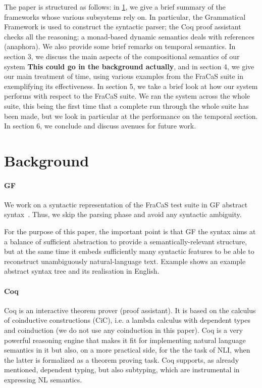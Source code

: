 \documentclass[a4paper,11pt]{article}
\begin{document}
The paper is structured as follows: in \cref{sec:background}, we give
a brief summary of the frameworks whose various subsystems rely on. In
particular, the Grammatical Framework is used to construct the
syntactic parser; the Coq proof assistant checks all the reasoning; a
monad-based dynamic semantics deals with references (anaphora).  We
also provide some brief remarks on temporal semantics. In section 3,
we discuss the main aspects of the compositional semantics of our
system \textbf{This could go in the background actually}, and in
section 4, we give our main treatment of time, using various examples
from the FraCaS suite in exemplifying its effectiveness. In section 5,
we take a brief look at how our system performs with respect to the
FraCaS suite. We ran the system across the whole suite, this being the
first time that a complete run through the whole suite has been made,
but we look in particular at the performance on the temporal
section. In section 6, we conclude and discuss avenues for future
work.



\section{Background}
\label{sec:background}

\paragraph{GF}
We work on a syntactic representation of the FraCaS test suite in GF
abstract syntax~\citep{Ljunglof:2012}. Thus, we skip the
parsing phase and avoid any syntactic ambiguity.

For the purpose of this paper, the important point is that GF the
syntax aims at a balance of sufficient abstraction to provide a
semantically-relevant structure, but at the same time it embeds
sufficiently many syntactic features to be able to reconstruct
unambiguously natural-language text. Example \label{ex:onelingex}
shows an example abstract syntax tree and its realisation in English.

\paragraph{Coq}
 Coq is an interactive theorem prover (proof assistant). It is based on the
calculus of coinductive constructions (CiC), i.e.  a lambda calculus
with dependent types and coinduction (we do not use any coinduction in this paper).  Coq is a very powerful reasoning engine
that makes it fit for implementing natural language semantics in it but also, on a more practical side, for the the task of NLI, when the latter is formalized
as a theorem proving task. Coq supports, as already mentioned,
 dependent typing, but also subtyping, which are instrumental in
expressing NL semantics.
\end{document}
